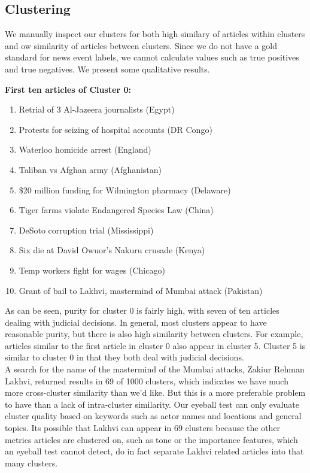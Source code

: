 
\subsection{Clustering}

We manually inspect our clusters for both high similary of articles within clusters and ow similarity of articles between clusters. Since we do not have a gold standard for news event labels, we cannot calculate values such as true positives and true negatives. We present some qualitative results.

\textbf{First ten articles of Cluster 0:}  
\begin{enumerate}
\item Retrial of 3 Al-Jazeera journalists (Egypt)
\item Protests for seizing of hospital accounts (DR Congo)
\item Waterloo homicide arrest (England)
\item Taliban vs Afghan army (Afghanistan)
\item \$20 million funding for Wilmington pharmacy (Delaware)
\item Tiger farms violate Endangered Species Law (China)
\item DeSoto corruption trial (Mississippi)
\item Six die at David Owuor's Nakuru crusade (Kenya)
\item Temp workers fight for wages (Chicago)
\item Grant of bail to Lakhvi, mastermind of Mumbai attack (Pakistan)
\end{enumerate}

As can be seen, purity for cluster 0 is fairly high, with seven of ten articles dealing with judicial decisions. In general, most clusters appear to have reasonable purity, but there is also high similarity between clusters. For example, articles similar to the first article in cluster 0 also appear in cluster 5. Cluster 5 is similar to cluster 0 in that they both deal with judicial decisions.\\

\noindent A search for the name of the mastermind of the Mumbai attacks, Zakiur Rehman Lakhvi, returned results in 69 of 1000 clusters, which indicates we have much more cross-cluster similarity than we'd like. But this is a more preferable problem to have than a lack of intra-cluster similarity. Our eyeball test can only evaluate cluster quality based on keywords such as actor names and locations and general topics. Its possible that Lakhvi can appear in 69 clusters because the other metrics articles are clustered on, such as tone or the importance features, which an eyeball test cannot detect, do in fact separate Lakhvi related articles into that many clusters.

